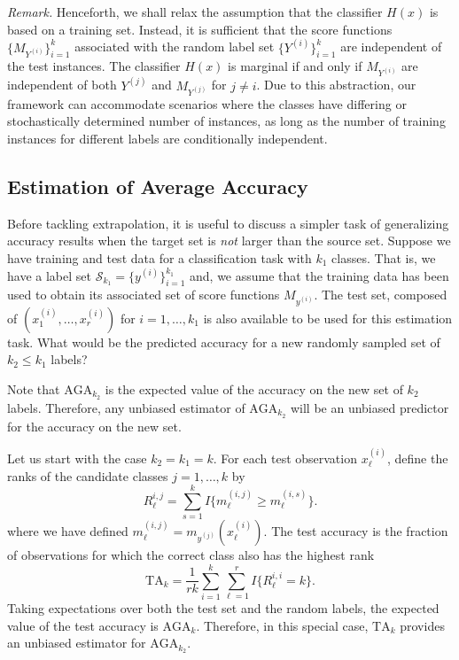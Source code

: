 \documentclass[twoside,11pt]{article}
\begin{document}
\emph{Remark.}  Henceforth, we shall relax the assumption
that the classifier $H(x)$ is based on a training set.  Instead, it is sufficient 
that the score functions $\{M_{Y^{(i)}}\}_{i=1}^k$ associated with the random label set $\{Y^{(i)}\}_{i=1}^k$
are independent of the test instances. The classifier $H(x)$ is marginal if and only if $M_{Y^{(i)}}$ are
independent of both $Y^{(j)}$ and $M_{Y^{(j)}}$ for $j \neq i$. Due to this abstraction, 
our framework can accommodate scenarios where the classes have differing or stochastically determined number of instances, as long as the number of training instances for different labels are conditionally independent. %

\subsection{Estimation of Average Accuracy}\label{sec:estimation_average_accuracy}

Before tackling extrapolation, it is useful to discuss a simpler task of generalizing accuracy results when the target set is \emph{not} larger than the source set. Suppose we have training and test data for a classification task with $k_1$
classes.  
That is, we have a label set $\mathcal{S}_{k_1} =
\{y^{(i)}\}_{i=1}^{k_1}$ and,
we assume that the training data has been used to obtain its associated set of score functions
$M_{y^{(i)}}$.
The test set, composed of $(x_1^{(i)},\hdots,
x_{r}^{(i)})$ for $i = 1,\hdots, k_1$ is also available to be used for this estimation task.  
What would be the predicted
accuracy for a new randomly sampled set of $k_2 \leq k_1$ labels?

Note that $\text{AGA}_{k_2}$ is the expected value of the accuracy on
the new set of $k_2$ labels.  Therefore, any unbiased estimator of
$\text{AGA}_{k_2}$ will be an unbiased predictor for the accuracy on
the new set.

Let us start with the case $k_2 = k_1 = k$.  For each test observation
$x_\ell^{(i)}$, define the ranks of the candidate classes $j =
1,\hdots, k$ by
\[
R_{\ell}^{i, j} = \sum_{s = 1}^k I\{m^{(i,j)}_\ell \geq m^{(i,s)}_\ell\}.
\]
where we have defined $m^{(i, j)}_\ell = m_{y^{(j)}}(x_\ell^{(i)})$.
The test accuracy is the fraction of observations for which the
correct class also has the highest rank
\begin{equation}\label{eq:test_risk}
\text{TA}_k = \frac{1}{r k} \sum_{i=1}^{k} \sum_{\ell=1}^{r} I\{R_\ell^{i,i} = k\}.
\end{equation}
Taking expectations over both the test set and the random labels, the
expected value of the test accuracy is $\text{AGA}_k$.  Therefore, in this special case, $\text{TA}_k$ provides an unbiased estimator for $\text{AGA}_{k_2}$.
\end{document}
